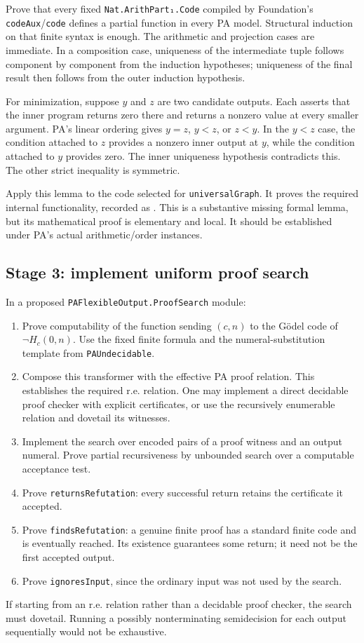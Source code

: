 \documentclass[11pt]{article}
\theoremstyle{definition}
\theoremstyle{remark}
\begin{document}
Prove that every fixed \texttt{Nat.ArithPart₁.Code} compiled by
Foundation's \texttt{codeAux}/\texttt{code} defines a partial function in
every PA model. Structural induction on that finite syntax is enough.
The arithmetic and projection cases are immediate. In a composition
case, uniqueness of the intermediate tuple follows component by
component from the induction hypotheses; uniqueness of the final result
then follows from the outer induction hypothesis.

For minimization, suppose $y$ and $z$ are two candidate outputs. Each
asserts that the inner program returns zero there and returns a nonzero
value at every smaller argument. PA's linear ordering gives $y=z$,
$y<z$, or $z<y$. In the $y<z$ case, the condition attached to $z$
provides a nonzero inner output at $y$, while the condition attached to
$y$ provides zero. The inner uniqueness hypothesis contradicts this.
The other strict inequality is symmetric.

Apply this lemma to the code selected for \texttt{universalGraph}.
It proves the required internal functionality, recorded as
.
This is a substantive missing formal lemma, but its mathematical proof is
elementary and local. It should be established under PA's actual
arithmetic/order instances.

\subsection{Stage 3: implement uniform proof search}

In a proposed \texttt{PAFlexibleOutput.ProofSearch} module:
\begin{enumerate}
 \item Prove computability of the function sending $(c,n)$ to the
       G\"odel code of $\neg H_c(0,n)$. Use the
       fixed finite formula and the numeral-substitution template from
       \texttt{PAUndecidable}.
 \item Compose this transformer with the effective PA proof relation.
       This establishes the required r.e. relation. One may implement a direct
       decidable proof checker with explicit certificates, or use the
       recursively enumerable relation and dovetail its witnesses.
 \item Implement the search over encoded pairs of a proof witness and
       an output numeral. Prove partial recursiveness by unbounded
       search over a computable acceptance test.
 \item Prove \texttt{returnsRefutation}: every successful return
       retains the certificate it accepted.
 \item Prove \texttt{findsRefutation}: a genuine finite proof has a
       standard finite code and is eventually reached. Its existence
       guarantees some return; it need not be the first accepted
       output.
 \item Prove \texttt{ignoresInput}, since the ordinary input was not
       used by the search.
\end{enumerate}
If starting from an r.e. relation rather than a decidable proof checker,
the search must dovetail. Running a possibly nonterminating semidecision
for each output sequentially would not be exhaustive.
\end{document}
